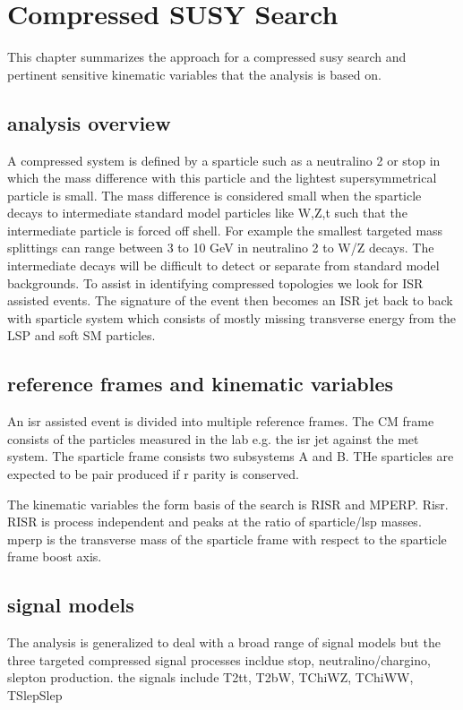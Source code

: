 
\setcounter{secnumdepth}{3}
\setcounter{tocdepth}{3}
\setlength{\parskip}{\smallskipamount}
\setlength{\parindent}{0pt}


\makeatletter


\providecommand{\tabularnewline}{\\}


\makeatother

%

\chapter{Compressed SUSY Search}

\begin{chapterabstract}
This chapter summarizes the approach for a compressed susy search and pertinent sensitive kinematic variables that the analysis is based on.
\end{chapterabstract}

\section{analysis overview}

A compressed system is defined by a sparticle such as a neutralino 2 or stop in which the mass difference with this particle and the lightest supersymmetrical particle is small. The mass difference is considered small when the sparticle decays to intermediate standard model particles like W,Z,t such that the intermediate particle is forced off shell. For example the smallest targeted mass splittings can range between 3 to 10 GeV in neutralino 2 to W/Z decays. The intermediate decays will be difficult to detect or separate from standard model backgrounds. To assist in identifying compressed topologies we look for ISR assisted events. The signature of the event then becomes an ISR jet back to back with sparticle system which consists of mostly missing transverse energy from the LSP and soft SM particles.


\section{ reference frames and kinematic variables}
An isr assisted event is divided into multiple reference frames. The CM frame consists of the particles measured in the lab e.g. the isr jet against the met system. The sparticle frame consists two subsystems A and B. THe sparticles are expected to be pair produced if r parity is conserved.

The kinematic variables the form basis of the search is RISR and MPERP.
Risr. RISR is process independent and peaks at the ratio of sparticle/lsp masses. mperp is the transverse mass of the sparticle frame with respect to the sparticle frame boost axis.  


\section{ signal models}
The analysis is generalized to deal with a broad range of signal models but the three targeted compressed signal processes incldue stop, neutralino/chargino, slepton production. the signals include T2tt, T2bW, TChiWZ, TChiWW, TSlepSlep
